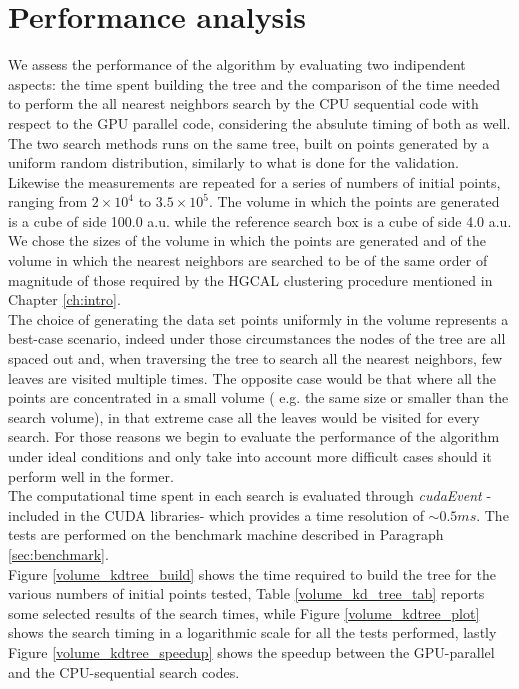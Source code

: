 \section{Performance analysis}
We assess the performance of the algorithm by evaluating two indipendent aspects: the time spent building the tree and the comparison of the time needed to perform the all nearest neighbors search by the CPU sequential code with respect to the GPU parallel code, considering the absulute timing of both as well.\\
The two search methods runs on the same tree, built on points generated by a uniform random distribution, similarly to what is done for the validation. Likewise the measurements are repeated for a series of numbers of initial points, ranging from  $2 \times 10^{4}$ to $3.5 \times 10^{5}$. The volume in which the points are generated is a cube of side 100.0 a.u. while the reference search box is a cube of side 4.0 a.u.\\
We chose the sizes of the volume in which the points are generated and of the volume in which the nearest neighbors are searched to be of the same order of magnitude of those required by the HGCAL clustering procedure mentioned in Chapter \ref{ch:intro}.\\
The choice of generating the data set points uniformly in the volume represents a best-case scenario, indeed under those circumstances the nodes of the tree are all spaced out and, when traversing the tree to search all the nearest neighbors, few leaves are visited multiple times. The opposite case would be that where all the points are concentrated in a small volume ( e.g. the same size or smaller than the search volume), in that extreme case all the leaves would be visited for every search. For those reasons we begin to evaluate the performance of the algorithm under ideal conditions and only take into account more difficult cases should it perform well in the former.\\
The computational time spent in each search is evaluated through \textit{cudaEvent} -included in the CUDA libraries- which provides a time resolution of $\sim 0.5\unit{ms}$. The tests are performed on the benchmark machine described in Paragraph \ref{sec:benchmark}.\\
Figure \ref{volume_kdtree_build} shows the time required to build the tree for the various numbers of initial points tested, Table \ref{volume_kd_tree_tab} reports some selected results of the search times, while Figure \ref{volume_kdtree_plot} shows the search timing in a logarithmic scale for all the tests performed, lastly Figure \ref{volume_kdtree_speedup} shows the speedup between the GPU-parallel and the CPU-sequential search codes.\\

